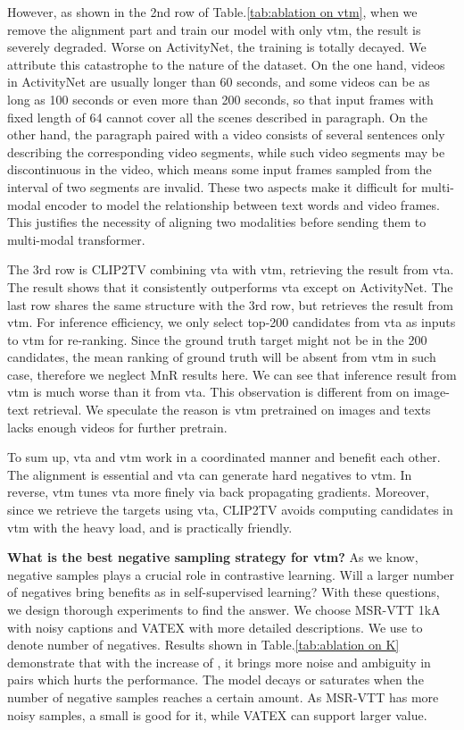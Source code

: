 However, as shown in the 2nd row of Table.\ref{tab:ablation on vtm}, when we remove the alignment part and train our model with only vtm, the result is severely degraded. Worse on ActivityNet, the training is totally decayed. We attribute this catastrophe to the nature of the dataset. On the one hand, videos in ActivityNet are usually longer than 60 seconds, and some videos can be as long as 100 seconds or even more than 200 seconds, so that input frames with fixed length of 64 cannot cover all the scenes described in paragraph. On the other hand, the paragraph paired with a video consists of several sentences only describing the corresponding video segments, while such video segments may be discontinuous in the video, which means some input frames sampled from the interval of two segments are invalid. These two aspects make it difficult for multi-modal encoder to model the relationship between text words and video frames. This justifies the necessity of aligning two modalities before sending them to multi-modal transformer.

The 3rd row is CLIP2TV combining vta with vtm, retrieving the result from vta. The result shows that it consistently outperforms vta except on ActivityNet.
The last row shares the same structure with the 3rd row, but retrieves the result from vtm. For inference efficiency, we only select top-200 candidates from vta as inputs to vtm for re-ranking. Since the ground truth target might not be in the 200 candidates, the mean ranking of ground truth will be absent from vtm in such case, therefore we neglect MnR results here. We can see that inference result from vtm is much worse than it from vta. This observation is different from \cite{li2021align} on image-text retrieval. We speculate the reason is vtm pretrained on images and texts lacks enough videos for further pretrain.

To sum up, vta and vtm work in a coordinated manner and benefit each other. The alignment is essential and vta can generate hard negatives to vtm. In reverse, vtm tunes vta more finely via back propagating gradients. Moreover, since we retrieve the targets using vta, CLIP2TV avoids computing candidates in vtm with the heavy load, and is practically friendly.

\noindent\textbf{What is the best negative sampling strategy for vtm?} As we know, negative samples plays a crucial role in contrastive learning. Will a larger number of negatives bring benefits as in self-supervised learning? With these questions, we design thorough experiments to find the answer. We choose MSR-VTT 1kA with noisy captions and VATEX with more detailed descriptions. We use  to denote number of negatives. Results shown in Table.\ref{tab:ablation on K} demonstrate that with the increase of , it brings more noise and ambiguity in pairs which hurts the performance. The model decays or saturates when the number of negative samples reaches a certain amount. As MSR-VTT has more noisy samples, a small  is good for it, while VATEX can support larger  value.

